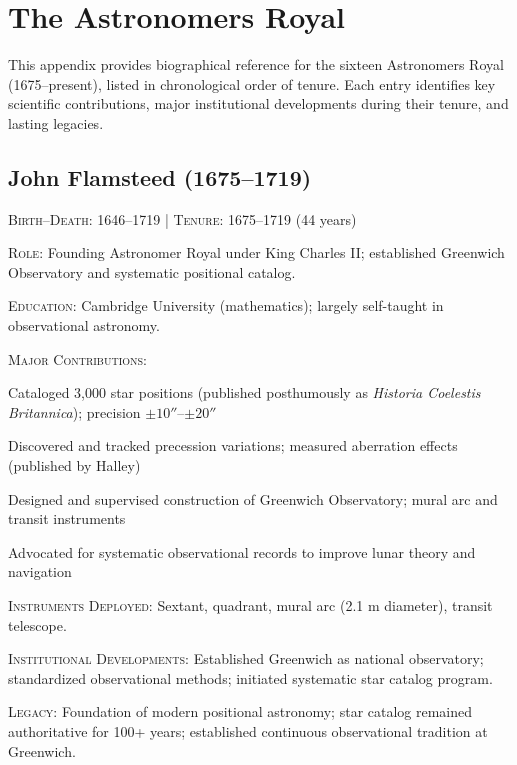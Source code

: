 \chapter{The Astronomers Royal}
\label{app:astronomers-royal}

This appendix provides biographical reference for the sixteen Astronomers Royal (1675--present), listed in chronological order of tenure. Each entry identifies key scientific contributions, major institutional developments during their tenure, and lasting legacies.

\section*{John Flamsteed (1675--1719)}
\textsc{Birth--Death}: 1646--1719 | \textsc{Tenure}: 1675--1719 (44 years)

\noindent\textsc{Role}: Founding Astronomer Royal under King Charles II; established Greenwich Observatory and systematic positional catalog.

\noindent\textsc{Education}: Cambridge University (mathematics); largely self-taught in observational astronomy.

\noindent\textsc{Major Contributions}: 
\begin{enumerate*}[label=(\arabic*)]
\item Cataloged 3,000 star positions (published posthumously as \emph{Historia Coelestis Britannica}); precision $\pm 10''$--$\pm 20''$
\item Discovered and tracked precession variations; measured aberration effects (published by Halley)
\item Designed and supervised construction of Greenwich Observatory; mural arc and transit instruments
\item Advocated for systematic observational records to improve lunar theory and navigation
\end{enumerate*}

\noindent\textsc{Instruments Deployed}: Sextant, quadrant, mural arc (2.1 m diameter), transit telescope.

\noindent\textsc{Institutional Developments}: Established Greenwich as national observatory; standardized observational methods; initiated systematic star catalog program.

\noindent\textsc{Legacy}: Foundation of modern positional astronomy; star catalog remained authoritative for 100+ years; established continuous observational tradition at Greenwich.

